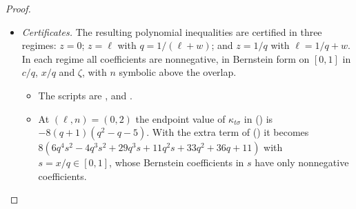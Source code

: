 \documentclass[twoside,10pt]{article}
\numberwithin{equation}{section}
\theoremstyle{slbody}
\theoremstyle{definition}
\theoremstyle{remark}
\renewcommand{\eqref}[1]{\textup{{\normalfont(\oldstylenums{\ref{#1}}}\normalfont)}}
\begin{document}
\begin{proof}
\begin{itemize}
\begin{itemize}
  \end{itemize}
\item \emph{Certificates.} The resulting polynomial inequalities are certified in three regimes: $z=0$; $z=\ell$ with $q=1/(\ell+w)$; and $z=1/q$ with $\ell=1/q+w$. In each regime all coefficients are nonnegative, in Bernstein form on $[0,1]$ in $c/q$, $x/q$ and $\zeta$, with $n$ symbolic above the overlap.
  \begin{itemize}
  \item The scripts are ,  and .
  \item At $(\ell,n)=(0,2)$ the endpoint value of $\kappa_{t\sigma}$ in \eqref{eq:cubic-B} is $-8(q+1)(q^2-q-5)$. With the extra term of \eqref{eq:cubic-corner} it becomes $8(6q^4s^2-4q^3s^2+29q^3s+11q^2s+33q^2+36q+11)$ with $s=x/q\in[0,1]$, whose Bernstein coefficients in $s$ have only nonnegative coefficients.
  \end{itemize}
\end{itemize}


\end{proof}
\end{document}

